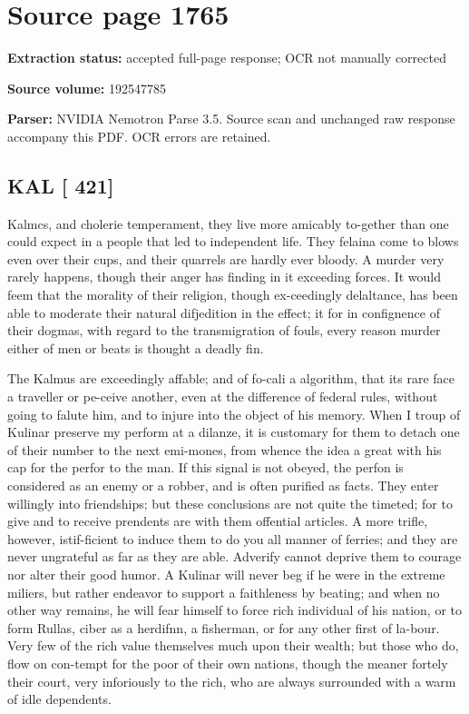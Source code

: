 \clearpage
\section{Source page 1765}
\textbf{Extraction status:} accepted full-page response; OCR not manually corrected\par
\textbf{Source volume:} 192547785\par
\textbf{Parser:} NVIDIA Nemotron Parse 3.5. Source scan and unchanged raw response accompany this PDF. OCR errors are retained.\par\medskip
\subsection*{KAL [ 421]}
Kalmcs, and cholerie temperament, they live more amicably to-gether than one could expect in a people that led to independent life. They felaina come to blows even over their cups, and their quarrels are hardly ever bloody. A murder very rarely happens, though their anger has finding in it exceeding forces. It would feem that the morality of their religion, though ex-ceedingly delaltance, has been able to moderate their natural difjedition in the effect; it for in confignence of their dogmas, with regard to the transmigration of fouls, every reason murder either of men or beats is thought a deadly fin.\par\medskip
The Kalmus are exceedingly affable; and of fo-cali a algorithm, that its rare face a traveller or pe-ceive another, even at the difference of federal rules, without going to falute him, and to injure into the object of his memory. When I troup of Kulinar preserve my perform at a dilanze, it is customary for them to detach one of their number to the next emi-mones, from whence the idea a great with his cap for the perfor to the man. If this signal is not obeyed, the perfon is considered as an enemy or a robber, and is often purified as facts. They enter willingly into friendships; but these conclusions are not quite the timeted; for to give and to receive prendents are with them offential articles. A more trifle, however, istif-ficient to induce them to do you all manner of ferries; and they are never ungrateful as far as they are able. Adverify cannot deprive them to courage nor alter their good humor. A Kulinar will never beg if he were in the extreme miliers, but rather endeavor to support a faithleness by beating; and when no other way remains, he will fear himself to force rich individual of his nation, or to form Rullas, ciber as a herdifnn, a fisherman, or for any other first of la-bour. Very few of the rich value themselves much upon their wealth; but those who do, flow on con-tempt for the poor of their own nations, though the meaner fortely their court, very inforiously to the rich, who are always surrounded with a warm of idle dependents.\par\medskip
